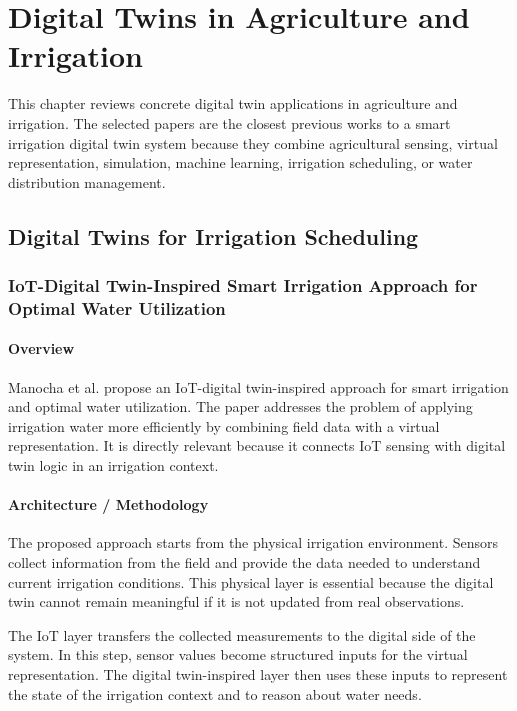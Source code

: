 \chapter{Digital Twins in Agriculture and Irrigation}

This chapter reviews concrete digital twin applications in agriculture and irrigation. The selected papers are the closest previous works to a smart irrigation digital twin system because they combine agricultural sensing, virtual representation, simulation, machine learning, irrigation scheduling, or water distribution management.

\section{Digital Twins for Irrigation Scheduling}

\subsection[IoT-Digital Twin-Inspired Smart Irrigation Approach for Optimal Water Utilization]{IoT-Digital Twin-Inspired Smart Irrigation Approach for Optimal Water Utilization \cite{manocha2024iotdtirrigation}}

\subsubsection{Overview}

Manocha et al. propose an IoT-digital twin-inspired approach for smart irrigation and optimal water utilization. The paper addresses the problem of applying irrigation water more efficiently by combining field data with a virtual representation. It is directly relevant because it connects IoT sensing with digital twin logic in an irrigation context.

\subsubsection{Architecture / Methodology}

The proposed approach starts from the physical irrigation environment. Sensors collect information from the field and provide the data needed to understand current irrigation conditions. This physical layer is essential because the digital twin cannot remain meaningful if it is not updated from real observations.

The IoT layer transfers the collected measurements to the digital side of the system. In this step, sensor values become structured inputs for the virtual representation. The digital twin-inspired layer then uses these inputs to represent the state of the irrigation context and to reason about water needs.

